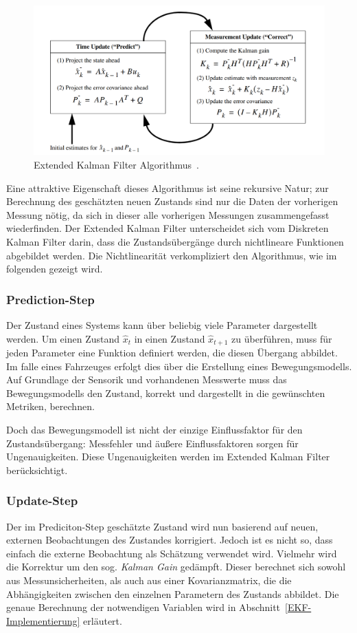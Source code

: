 \documentclass[11pt]{article}
\begin{document}
\begin{figure}[!t]
	\centering
	\includegraphics[width=5in]{EKF_algorithm.png}
	\caption{Extended Kalman Filter Algorithmus~\cite{EKF_course}.}
	\label{EKF-Algorithmus}
\end{figure}

Eine attraktive Eigenschaft dieses Algorithmus ist seine rekursive Natur; zur Berechnung des geschätzten neuen Zustands sind nur die Daten der vorherigen Messung nötig, da sich  in dieser alle vorherigen Messungen zusammengefasst wiederfinden. Der Extended Kalman Filter unterscheidet sich vom Diskreten Kalman Filter darin, dass die Zustandsübergänge durch nichtlineare Funktionen abgebildet werden. Die Nichtlinearität verkompliziert den Algorithmus, wie im folgenden gezeigt wird.

\subsubsection{Prediction-Step}
Der Zustand eines Systems kann über beliebig viele Parameter dargestellt werden. Um einen Zustand $\hat{x}_t$ in einen Zustand $\hat{x}_{t+1}$ zu überführen, muss für jeden Parameter eine Funktion definiert werden, die diesen Übergang abbildet. Im falle eines Fahrzeuges erfolgt dies über die Erstellung eines Bewegungsmodells. Auf Grundlage der Sensorik und vorhandenen Messwerte muss das Bewegungsmodells den Zustand, korrekt und dargestellt in die gewünschten Metriken, berechnen.

Doch das Bewegungsmodell ist nicht der einzige Einflussfaktor für den Zustandsübergang: Messfehler und äußere Einflussfaktoren sorgen für Ungenauigkeiten. Diese Ungenauigkeiten werden im Extended Kalman Filter berücksichtigt.

\subsubsection{Update-Step}
Der im Prediciton-Step geschätzte Zustand wird nun basierend auf neuen, externen Beobachtungen des Zustandes korrigiert. Jedoch ist es nicht so, dass einfach die externe Beobachtung als Schätzung verwendet wird. Vielmehr wird die Korrektur um den sog. \textit{Kalman Gain} gedämpft. Dieser berechnet sich sowohl aus Messunsicherheiten, als auch aus einer Kovarianzmatrix, die die Abhängigkeiten zwischen den einzelnen Parametern des Zustands abbildet. Die genaue Berechnung der notwendigen Variablen wird in Abschnitt~\ref{EKF-Implementierung} erläutert.
\end{document}
